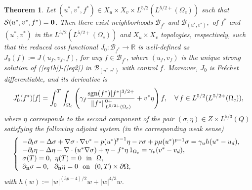 \documentclass[11pt,reqno]{amsart}%
\newtheorem{theorem}{Theorem}[section]
\numberwithin{equation}{section}
\begin{document}
\begin{theorem}
\label{FOC}
Let $(u^*,v^*,f^*)\in X_u\times X_v \times L^{5/2}(L^{5/2+}(\Omega_c))$ such that $\mathcal{S}(u^*,v^*,f^*)=\bf 0$. 
Then there exist neighborhoods $\mathcal{B}_{f^*}$ and $\mathcal{B}_{(u^{*},v^{*})},$ of $f^{*}$ and $(u^{*},v^{*})$ in the $L^{5/2}(L^{5/2+}(\Omega_c))$ and $X_u\times X_v$ topologies, respectively, such that the reduced cost functional $J_0:\mathcal{B}_{f^*}\rightarrow \mathbb{R}$ is well-defined as $J_0(f):=J(u_f,v_f,f)$, for any $f\in \mathcal{B}_{f^*}$, where $(u_f,v_f)$ is the unique strong solution of (\ref{eq1b})-(\ref{eq2}) in $\mathcal{B}_{(u^{*},v^{*})}$ with control $f$. 
 Moreover, $J_0$ is Fr\'echet differentiable, and its derivative is 
\begin{eqnarray}\label{cop2a}
J_0'(f^*)[f]=
\int_0^T\int_{\Omega_c}\left(
\gamma_f 
\frac{{\rm sgn}(f^{*})\vert f^{*}\vert^{3/2+}}
{\| f^* \|_{L^{5/2+}(\Omega_c)}^{0+}}
+{v^*}\eta\right)f ,\quad  \forall \, {f}\in L^{5/2}(L^{5/2+}(\Omega_c)),
\end{eqnarray}
where $\eta$ corresponds to the second component of the pair $(\sigma,\eta)\in  Z\times L^{5/3}(Q)$ satisfying the following adjoint system  (in the corresponding weak sense)
\begin{equation}\label{adjz0}
\left\{
\begin{array}{l}%
  -\partial_t\sigma-\Delta\sigma+\nabla\sigma\cdot\nabla{v^*}-p{(u^*)}^{p-1}\eta-r\sigma+p\mu (u^*)^{p-1}\sigma=
  \gamma_u  h({u^*}-u_d) ,\\ 
  -\partial_t\eta-\Delta\eta-\nabla\cdot({u^*}\nabla\sigma)+\eta-{f^*}\eta\,1_{\Omega_c}=\gamma_v({v^*}-v_d),\\
  \sigma(T)=0,\ \eta(T)=0\ \mbox{ in }\ \Omega,\\
{\partial_{\bf n}\sigma}=0,\ \ {\partial_{\bf n}\eta}=0\ \mbox{ on }\  (0,T)\times\partial\Omega,
 \end{array}
\right.
\end{equation}
with $h(w):=|w|^{(5p-4)/2} w+|w|^{4/3}w$.
 \end{theorem}
\end{document}

